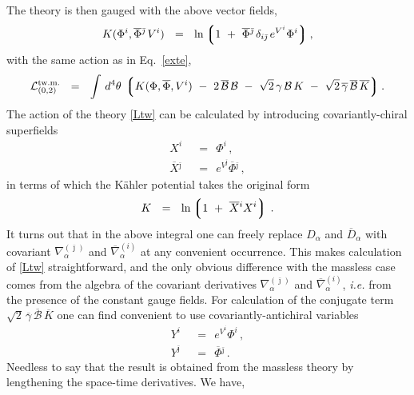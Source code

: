 \documentclass[12pt]{article}
\def\beq{\begin{equation}}
\def\eeq{\end{equation}}
\newcommand{\ov}{\overline}
\newcommand{\mc}[1]{\mathcal{#1}}
\newcommand{\lgr}{\left\lgroup}
\newcommand{\rgr}{\right\rgroup}
\newcommand{\bj}{{\bar \jmath}}
\begin{document}
	The theory is then gauged with the above vector fields,
\[
	K(\Phi^i, \ov{\Phi}{}^\bj\, V^i) ~~=~~
		\ln \lgr 1 ~+~ \ov{\Phi}{}^\bj\, \delta_{i\bj}\, e^{V^i} \Phi^i \rgr ,
\]	
	with the same action as in Eq.~\eqref{exte},
\beq
\label{Ltw}
	\mc{L}_{(0,2)}^\text{tw.m.} ~~=~~ \int\, d^4\theta\, \lgr K(\Phi,\ov{\Phi}, V^i) 
		~-~ 2\, \ov{\mc{B}}\,\mc{B}  
		~-~  \sqrt{2}\, \gamma\,\mc{B}\,K  ~-~ \sqrt{2}\, \ov{\gamma}\,\ov{\mc{B}}\,\ov{K} \rgr.
\eeq
	The action of the theory \eqref{Ltw} can be calculated by introducing covariantly-chiral superfields
\begin{align*}
%
	X^i & ~~=~~ \Phi^i\,, \\
%
	\ov{X}{}^\bj & ~~=~~ e^{V^\bj} \ov{\Phi}{}^\bj\,,
\end{align*}
	in terms of which the K\"{a}hler potential takes the original form
\[
	K ~~=~~ \ln \lgr 1 ~+~ \ov{X}{}^i X^i \rgr\,.
\]
	It turns out that in the above integral one can freely replace $ D_\alpha $ and $ \ov{D}{}_\alpha $ with
	covariant $ \nabla^{(\bj)}_\alpha $ and $ \ov{\nabla}{}^{(i)}_\alpha $ at any convenient occurrence.
	This makes calculation of \eqref{Ltw} straightforward, and the only obvious difference with the massless
	case comes from the algebra of the covariant derivatives $ \nabla^{(\bj)}_\alpha $ and 
	$ \ov{\nabla}{}^{(i)}_\alpha $, {\it i.e.} from the presence of the constant gauge fields.
	For calculation of the conjugate term $ \sqrt{2}\, \ov{\gamma}\,\ov{\mc{B}}\,\ov{K} $ one can find convenient to 
	use covariantly-antichiral variables
\begin{align*}
%
	Y^i & ~~=~~ e^{V^i} \Phi^i\,, \\
%
	Y^\bj & ~~=~~ \ov{\Phi}{}^\bj\,.
\end{align*}
	Needless to say that the result is obtained from the massless theory by lengthening the space-time derivatives.
	We have,
\end{document}
